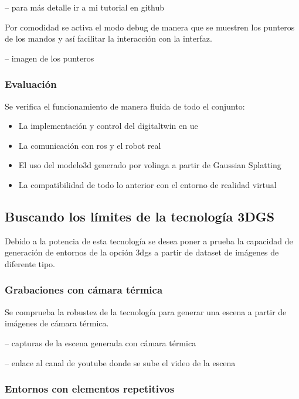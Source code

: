 \documentclass[a4paper, 12pt, spanish, twoside]{article}
\begin{document}
-- para más detalle ir a mi tutorial en github 

Por comodidad se activa el modo \gls{debug} de manera que se muestren los punteros de los mandos y así facilitar la interacción con la interfaz. 

-- imagen de los punteros 

\subsubsection{Evaluación} \label{sec:implementacion:3dgs-volinga:evaluacion}

Se verifica el funcionamiento de manera fluida de todo el conjunto: 

\begin{itemize} 
\item La implementación y control del \gls{digitaltwin} en \acrshort{ue} 
\item La comunicación con \acrshort{ros} y el robot real 
\item El uso del \gls{modelo3d} generado por \gls{volinga} a partir de Gaussian Splatting 
\item La compatibilidad de todo lo anterior con el entorno de realidad virtual 
\end{itemize} 

\subsection{Buscando los límites de la tecnología 3DGS} \label{sec:implementacion:limites-3dgs}

Debido a la potencia de esta tecnología se desea poner a prueba la capacidad de generación de entornos de la opción \acrshort{3dgs} a partir de \gls{dataset} de imágenes de diferente tipo. 

\subsubsection {Grabaciones con cámara térmica} \label{sec:implementacion:limites-3dgs:termica}

Se comprueba la robustez de la tecnología para generar una escena a partir de imágenes de cámara térmica. 

-- capturas de la escena generada con cámara térmica 

-- enlace al canal de youtube donde se sube el video de la escena 

\subsubsection {Entornos con elementos repetitivos} \label{sec:implementacion:limites-3dgs:repetitivos}
\end{document}
